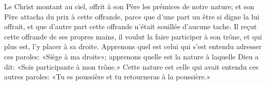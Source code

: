 Le Christ montant au ciel, offrit à son Père les prémices de notre nature;
	et son Père attacha du prix à cette offrande,
	parce que d’une part un être si digne la lui offrait,
	et que d’autre part cette offrande n’était souillée d’aucune tache.
Il reçut cette offrande de ses propres mains,
	il voulut la faire participer à son trône,
	et qui plus est, l’y placer à sa droite.
Apprenons quel est celui qui s’est entendu adresser ces paroles:
	«Siège à ma droite»;
	apprenons quelle est la nature à laquelle Dieu a dit:
	«Sois participante à mon trône.»
Cette nature est celle qui avait entendu ces autres paroles:
	«Tu es poussière et tu retourneras à la poussière.»
